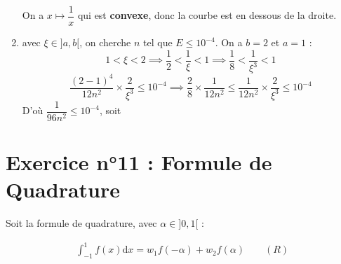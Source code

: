 \documentclass[12pt,a4paper]{article}
\begin{document}
\begin{enumerate}
\begin{center}
\begin{tikzpicture}
\end{tikzpicture}

On a $x \mapsto \dfrac{1}{x}$ qui est \textbf{convexe}, donc la courbe est en dessous de la droite.
\end{center}

\item {} avec $\xi\in ]a,b[$, on cherche $n$ tel que $E\leq 10^{-4}$. On a $b=2$ et $a=1$ :
$$
1<\xi<2 \implies \dfrac{1}{2}<\dfrac{1}{\xi} <1 \implies \dfrac{1}{8}<\dfrac{1}{\xi^3} <1
$$
$$
\dfrac{(2-1)^4}{12n^2}\times \dfrac{2}{\xi^3}\leq 10^{-4} \implies \dfrac{2}{8} \times \dfrac{1}{12n^2} \leq \dfrac{1}{12n^2} \times \dfrac{2}{\xi^3} \leq 10^{-4}
$$
D'où $\dfrac{1}{96n^2}\leq 10^{-4}$, soit 
\end{enumerate}

\section*{Exercice n°11 : Formule de Quadrature}

Soit la formule de quadrature, avec $\alpha \in ]0,1[$ : 

\begin{align*}
\int^1_{-1} f(x) \text{d}x = w_1 f(-\alpha)+w_2 f(\alpha) \qquad (R)
\end{align*}
\end{document}
